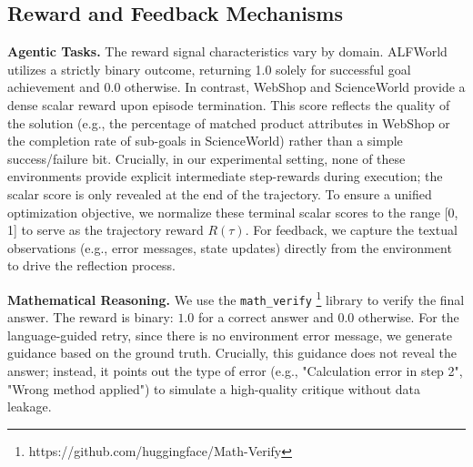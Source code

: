 \subsection{Reward and Feedback Mechanisms}
\textbf{Agentic Tasks.} The reward signal characteristics vary by domain. ALFWorld utilizes a strictly binary outcome, returning 1.0 solely for successful goal achievement and 0.0 otherwise. In contrast, WebShop and ScienceWorld provide a dense scalar reward upon episode termination. This score reflects the quality of the solution (e.g., the percentage of matched product attributes in WebShop or the completion rate of sub-goals in ScienceWorld) rather than a simple success/failure bit. Crucially, in our experimental setting, none of these environments provide explicit intermediate step-rewards during execution; the scalar score is only revealed at the end of the trajectory. To ensure a unified optimization objective, we normalize these terminal scalar scores to the range [0, 1] to serve as the trajectory reward $R(\tau)$. For feedback, we capture the textual observations (e.g., error messages, state updates) directly from the environment to drive the reflection process.

\textbf{Mathematical Reasoning.} We use the \texttt{math\_verify} \footnote{https://github.com/huggingface/Math-Verify } library to verify the final answer. The reward is binary: $1.0$ for a correct answer and $0.0$ otherwise. For the language-guided retry, since there is no environment error message, we generate guidance based on the ground truth. Crucially, this guidance does not reveal the answer; instead, it points out the type of error (e.g., "Calculation error in step 2", "Wrong method applied") to simulate a high-quality critique without data leakage.

